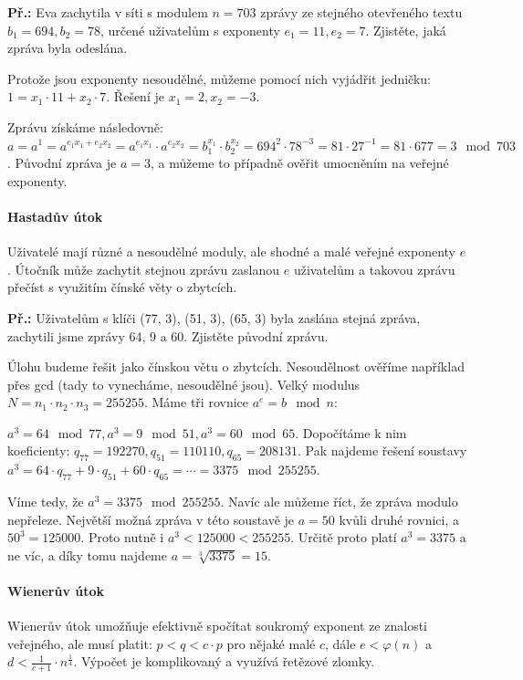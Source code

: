 \begin{exercise}
    \textbf{Př.:} Eva zachytila v síti s modulem $n = 703$ zprávy ze stejného
    otevřeného textu $b_1 = 694, b_2 = 78$, určené uživatelům s exponenty $e_1 =
    11, e_2 = 7$. Zjistěte, jaká zpráva byla odeslána.

    Protože jsou exponenty nesoudělné, můžeme pomocí nich vyjádřit jedničku: $1
    = x_1\cdot 11 + x_2 \cdot 7$. Řešení je $x_1 = 2, x_2 = -3$.

    Zprávu získáme následovně: $a = a^1 = a^{e_1x_1 + e_2x_2} = a^{e_1x_1}\cdot
    a^{e_2x_2} = b_1^{x_1} \cdot b_2^{x_2} = 694^2 \cdot 78^{-3} = 81 \cdot
    27^{-1} = 81 \cdot 677 = 3 \mod 703$. Původní zpráva je $a = 3$, a můžeme to
    případně ověřit umocněním na veřejné exponenty.
\end{exercise}

\paragraph{Hastadův útok}
Uživatelé mají různé a nesoudělné moduly, ale shodné a malé veřejné exponenty
$e$. Útočník může zachytit stejnou zprávu zaslanou $e$ uživatelům a takovou
zprávu přečíst s využitím čínské věty o zbytcích.

\begin{exercise}
    \textbf{Př.:} Uživatelům s klíči (77, 3), (51, 3), (65, 3) byla zaslána
    stejná zpráva, zachytili jsme zprávy 64, 9 a 60. Zjistěte původní zprávu.

    Úlohu budeme řešit jako čínskou větu o zbytcích. Nesoudělnost ověříme
    například přes gcd (tady to vynecháme, nesoudělné jsou). Velký modulus $N =
    n_1 \cdot n_2 \cdot n_3 = 255255$. Máme tři rovnice $a^e = b \mod n$: 

    $a^3 = 64 \mod 77, a^3 = 9 \mod 51, a^3 = 60 \mod 65$. Dopočítáme k nim
    koeficienty: $q_{77} = 192270, q_{51} = 110110, q_{65} = 208131$. Pak
    najdeme řešení soustavy $a^3 = 64\cdot q_{77} + 9\cdot q_{51} + 60 \cdot
    q_{65} = \cdots = 3375 \mod 255255$.

    Víme tedy, že $a^3 = 3375 \mod 255255$. Navíc ale můžeme říct, že zpráva
    modulo nepřeleze. Největší možná zpráva v této soustavě je $a=50$ kvůli
    druhé rovnici, a $50^3 = 125000$. Proto nutně i $a^3 < 125000 < 255255$.
    Určitě proto platí $a^3 = 3375$ a ne víc, a díky tomu najdeme $a =
    \sqrt[3]{3375} = 15$.
\end{exercise}

\paragraph{Wienerův útok}
Wienerův útok umožňuje efektivně spočítat soukromý exponent ze znalosti
veřejného, ale musí platit: $p < q < c \cdot p$ pro nějaké malé $c$, dále $e <
\varphi(n)$ a $d < \frac{1}{c+1}\cdot n^{\frac{1}{4}}$. Výpočet je komplikovaný
a využívá řetězové zlomky.

